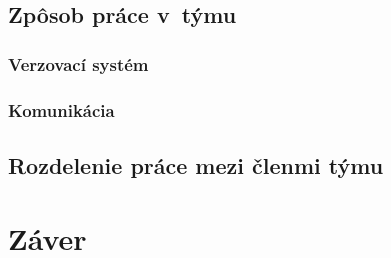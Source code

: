\documentclass[a4paper, 11pt]{article}
\begin{document}
    \subsection{Zpôsob práce v~týmu}



    \subsubsection{Verzovací systém}



    \subsubsection{Komunikácia}




    \subsection{Rozdelenie práce mezi členmi týmu}




    \section{Záver}




    \clearpage
    
    \renewcommand{\refname}{Literatura}
    



    \clearpage


\end{document}

